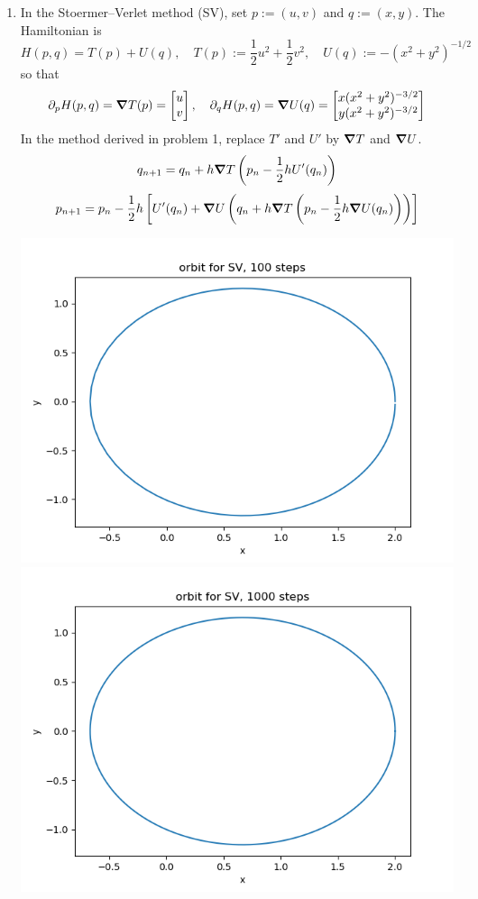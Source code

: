 \documentclass{article}
\newcommand{\br}[1]{\left(#1\right)}
\newcommand{\sbr}[1]{\left[#1\right]}
\newcommand{\m}[2][b]{\begin{#1matrix}#2\end{#1matrix}}
\newcommand{\ptl}{\partial}
\begin{document}
\begin{enumerate}[label=(\alph*)]
\item In the Stoermer--Verlet method (SV), set $p:=(u,v)$ and $q:=(x,y)$. The Hamiltonian is
$$H(p,q) = T(p) + U(q),
\quad T(p) := \frac12u^2 + \frac12v^2,
\quad U(q) := -(x^2 + y^2)^{-1/2}$$
so that
$$\ptl_pH(p,q) = \grad T(p) = \m{u \\ v},
\quad \ptl_qH(p,q) = \grad U(q) = \m{x(x^2+y^2)^{-3/2} \\ y(x^2+y^2)^{-3/2}}$$
In the method derived in problem 1, replace $T'$ and $U'$ by $\grad T$ and $\grad U$.
$$q_{n+1} = q_n + h\grad T\br{p_n - \frac12hU'(q_n)}$$
$$p_{n+1} = p_n - \frac12h\sbr{U'(q_n) + \grad U\br{q_n + h\grad T\br{p_n - \frac12h\grad U(q_n)}}}$$

\begin{center}
	\includegraphics[scale=.3]{hw5 SV orbit 100 steps}
	\includegraphics[scale=.3]{hw5 SV orbit 1000 steps}

\end{center}
\end{enumerate}
\end{document}
